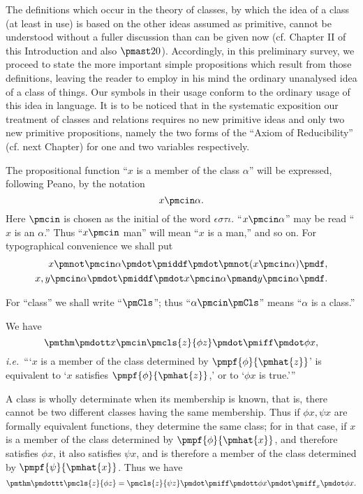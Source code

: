 \documentclass[letterpaper,12pt,openany,leqno]{book}
\newcommand{\pagefirst}[1]{\marginnote[\boxed{\text{#1}}]{\boxed{\text{#1}}}}
\begin{document}
The definitions which occur in the theory of classes, by which the idea of a class (at least in use) is based on the other ideas assumed as primitive, cannot be understood without a fuller discussion than can be given now (cf. Chapter II of this Introduction and also $\pmast20$). Accordingly, in this preliminary survey, we proceed to state the more important simple propositions which result from those definitions, leaving the reader to employ in his mind the ordinary unanalysed idea of a class of things. Our symbols in their usage conform to the ordinary usage of this idea in language. It is to be noticed that in the systematic exposition our treatment of classes and relations requires no new primitive ideas and only two new primitive propositions, namely the two forms of the ``Axiom of Reducibility'' (cf. next Chapter) for one and two variables respectively.

The propositional function ``$x$ is a member of the class $\alpha$'' will be expressed, following Peano, by the notation
\[
	x \pmcin \alpha.
\]
\pagefirst{26} Here $\pmcin$ is chosen as the initial of the word $\epsilon\sigma\tau\iota$. ``$x \pmcin \alpha$'' may be read ``$x$ is an $\alpha$.'' Thus ``$x \pmcin$ man'' will mean ``$x$ is a man,'' and so on. For typographical convenience we shall put
\begin{align*}
	x \pmnot \pmcin \alpha \pmdot \pmiddf \pmdot \pmnot (x \pmcin \alpha) \pmdf, \\
	x, y \pmcin \alpha \pmdot \pmiddf \pmdot x \pmcin \alpha \pmand y \pmcin \alpha \pmdf.
\end{align*}

For ``class'' we shall write ``$\pmCls$''; thus ``$\alpha \pmcin \pmCls$'' means ``$\alpha$ is a class.''

We have
\[
	\pmthm \pmdott x \pmcin \pmcls{z}{\phi z}\pmdot\pmiff\pmdot\phi x,
\]
\textit{i.e.}\ ```$x$ is a member of the class determined by $\pmpf{\phi}{\pmhat{z}}$' is equivalent to `$x$ satisfies $\pmpf{\phi}{\pmhat{z}}$,' or to `$\phi x$ is true.'''

A class is wholly determinate when its membership is known, that is, there cannot be two different classes having the same membership. Thus if $\phi x, \psi x$ are formally equivalent functions, they determine the same class; for in that case, if $x$ is a member of the class determined by $\pmpf{\phi}{\pmhat{x}}$, and therefore satisfies $\phi x$, it also satisfies $\psi x$, and is therefore a member of the class determined by $\pmpf{\psi}{\pmhat{x}}$. Thus we have
\[
	\pmthm\pmdottt \pmcls{z}{\phi z}=\pmcls{z}{\psi z} \pmdot \pmiff \pmdott \phi x \pmdot \pmiff_x \pmdot \phi x.
\]
\end{document}
